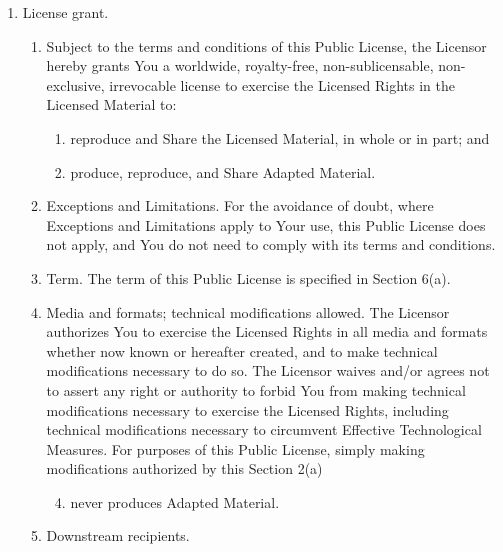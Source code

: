 \begin{enumerate}

\item
  License grant.

  \begin{enumerate}
  \item
    Subject to the terms and conditions of this Public License, the
    Licensor hereby grants You a worldwide, royalty-free,
    non-sublicensable, non-exclusive, irrevocable license to exercise
    the Licensed Rights in the Licensed Material to:

    \begin{enumerate}
    \item
      reproduce and Share the Licensed Material, in whole or in part;
      and
    \item
      produce, reproduce, and Share Adapted Material.
    \end{enumerate}
  \item
    Exceptions and Limitations.
    For the avoidance of doubt, where
    Exceptions and Limitations apply to Your use, this Public License
    does not apply, and You do not need to comply with its terms and
    conditions.
  \item
    Term.
    The term of this Public License is specified in Section 6(a).
  \item
    Media and formats;
    technical modifications allowed.
    The Licensor
    authorizes You to exercise the Licensed Rights in all media and
    formats whether now known or hereafter created, and to make
    technical modifications necessary to do so.
    The Licensor waives
    and/or agrees not to assert any right or authority to forbid You
    from making technical modifications necessary to exercise the
    Licensed Rights, including technical modifications necessary to
    circumvent Effective Technological Measures.
    For purposes of this
    Public License, simply making modifications authorized by this
    Section 2(a)

    \begin{enumerate}
    \setcounter{enumiii}{3}
    \tightlist
    \item
      never produces Adapted Material.
    \end{enumerate}
  \item
    Downstream recipients.


\end{enumerate}
\end{enumerate}
